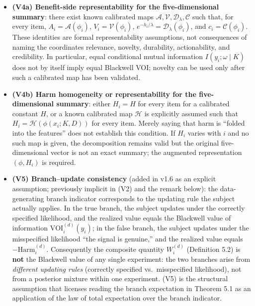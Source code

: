 \documentclass[
  11pt]{article}
\begin{document}
\begin{itemize}
  baselines. The substance of (V4): decisions differ only in ``weight,''
  not in value structure.
\item
  \textbf{(V4a) Benefit-side representability for the five-dimensional
  summary}: there exist known calibrated maps
  \(\mathcal A,\mathcal V,\mathcal D_\lambda,\mathcal C\) such that, for
  every item, \(A_i=\mathcal A(\phi_i)\), \(V_i=\mathcal V(\phi_i)\),
  \(e^{-h_i/\lambda}=\mathcal D_\lambda(\phi_i)\), and
  \(c_i=\mathcal C(\phi_i)\). These identities are formal
  representability assumptions, not consequences of naming the
  coordinates relevance, novelty, durability, actionability, and
  credibility. In particular, equal conditional mutual information
  \(I(y_i;\omega\mid K)\) does not by itself imply equal Blackwell VOI;
  novelty can be used only after such a calibrated map has been
  validated.
\item
  \textbf{(V4b) Harm homogeneity or representability for the
  five-dimensional summary}: either \(H_i=H\) for every item for a
  calibrated constant \(H\), or a known calibrated map \(\mathcal H\) is
  explicitly assumed such that \(H_i=\mathcal H(\phi(x_i;K,D))\) for
  every item. Merely saying that harm is ``folded into the features''
  does not establish this condition. If \(H_i\) varies with \(i\) and no
  such map is given, the decomposition remains valid but the original
  five-dimensional vector is not an exact summary; the augmented
  representation \((\phi,H_i)\) is required.
\item
  \textbf{(V5) Branch--update consistency} (added in v1.6 as an explicit
  assumption; previously implicit in (V2) and the remark below): the
  data-generating branch indicator corresponds to the updating rule the
  subject actually applies. In the true branch, the subject updates
  under the correctly specified likelihood, and the realized value
  equals the Blackwell value of information
  \(\mathrm{VOI}_i^{(d)}(y_i)\); in the false branch, the subject
  updates under the misspecified likelihood ``the signal is genuine,''
  and the realized value equals \(-\mathrm{Harm}_i^{(d)}\). Consequently
  the composite quantity \(W_i^{(d)}\) (Definition 5.2) is \textbf{not}
  the Blackwell value of any single experiment: the two branches arise
  from \emph{different updating rules} (correctly specified
  vs.~misspecified likelihood), not from a posterior mixture within one
  experiment. (V5) is the structural assumption that licenses reading
  the branch expectation in Theorem 5.1 as an application of the law of
  total expectation over the branch indicator.
\end{itemize}
\end{document}
